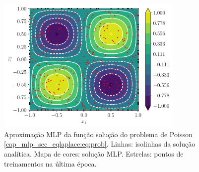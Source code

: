 \begin{figure}[H]
  \centering
  \includegraphics[width=0.8\textwidth]{cap_pinns/dados/py_pinn_poisson/fig}
  \caption{Aproximação MLP da função solução do problema de Poisson \eqref{cap_mlp_sec_eqlaplace:eq:prob}. Linhas: isolinhas da solução analítica. Mapa de cores: solução MLP. Estrelas: pontos de treinamentos na última época.}
  \label{fig:mlp_apfun_2d}
\end{figure}



